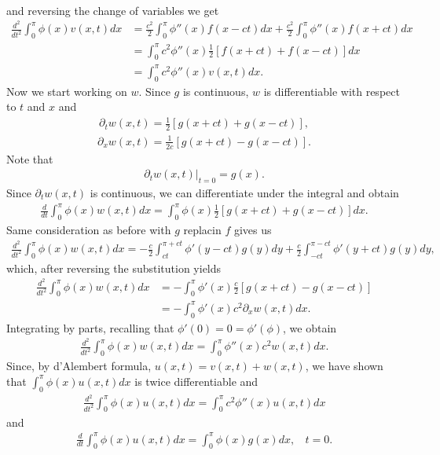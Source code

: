 \begin{questions}
\begin{solution}
\begin{align*}
\end{align*}
and reversing the change of variables we get
\begin{align*}
\frac{d^2}{dt^2}\int_0^\pi\phi(x)v(x,t)dx&=\frac{c^2}{2}\int_{0}^{\pi}\phi''(x)f(x-ct)dx+\frac{c^2}{2}\int_{0}^{\pi}\phi''(x)f(x+ct)dx\\
&=\int_{0}^{\pi}c^2\phi''(x)\frac{1}{2}\left[f(x+ct)+f(x-ct)\right] dx\\
&=\int_{0}^{\pi}c^2\phi''(x)v(x,t) dx.
\end{align*}
Now we start working on $w$. Since $g$ is continuous, $w$ is differentiable with respect to $t$ and $x$ and
\begin{align*}
\partial_tw(x,t)=\frac{1}{2}\left[g(x+ct)+g(x-ct)\right],
\end{align*}
\begin{align*}
\partial_xw(x,t)=\frac{1}{2c}\left[g(x+ct)-g(x-ct)\right].
\end{align*}
Note that 
\begin{align*}
\left.\partial_tw(x,t)\right|_{t=0}=g(x).
\end{align*}
Since $\partial_tw(x,t)$ is continuous, we can differentiate under the integral and obtain
\begin{align*}
\frac{d}{dt}\int_0^\pi\phi(x)w(x,t)dx=\int_0^\pi\phi(x)\frac{1}{2}\left[g(x+ct)+g(x-ct)\right]dx.
\end{align*}
Same consideration as before with $g$ replacin $f$ gives us
\begin{align*}
\frac{d^2}{dt^2}\int_0^\pi\phi(x)w(x,t)dx=-\frac{c}{2}\int_{ct}^{\pi+ct}\phi'(y-ct)g(y)dy+\frac{c}{2}\int_{-ct}^{\pi-ct}\phi'(y+ct)g(y)dy,
\end{align*}
which, after reversing the substitution yields
\begin{align*}
\frac{d^2}{dt^2}\int_0^\pi\phi(x)w(x,t)dx&=-\int_0^{\pi}\phi'(x)\frac{c}{2}\left[g(x+ct)-g(x-ct)\right]\\
&=-\int_0^{\pi}\phi'(x)c^2\partial_xw(x,t)dx.
\end{align*}
Integrating by parts, recalling that $\phi'(0)=0=\phi'(\phi)$, we obtain
\begin{align*}
\frac{d^2}{dt^2}\int_0^\pi\phi(x)w(x,t)dx=\int_0^{\pi}\phi''(x)c^2w(x,t)dx.
\end{align*}
Since, by d'Alembert formula, $u(x,t)=v(x,t)+w(x,t)$, we have shown that $\int_0^{\pi}\phi(x)u(x,t)dx$ is twice differentiable and 
\begin{align*}
\frac{d^2}{dt^2}\int_0^\pi\phi(x)u(x,t)dx=\int_0^{\pi}c^2\phi''(x)u(x,t)dx
\end{align*}
and
\begin{align*}
\frac{d}{dt}\int_0^\pi\phi(x)u(x,t)dx=\int_0^{\pi}\phi(x)g(x)dx,~~~~t=0.
\end{align*}
\end{solution}
\end{questions}